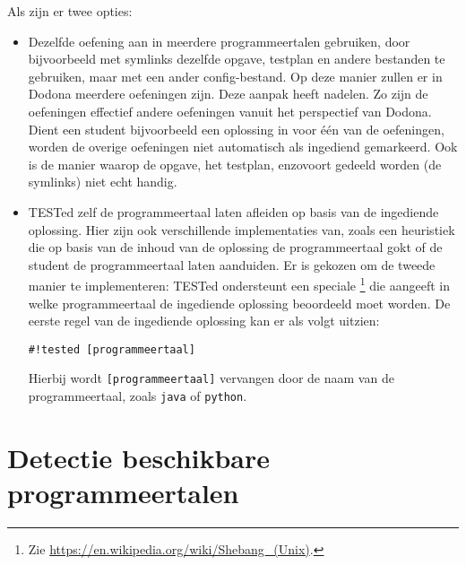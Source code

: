 Als  zijn er twee opties:
\begin{itemize}
    \item Dezelfde oefening aan in meerdere programmeertalen gebruiken, door bijvoorbeeld met symlinks dezelfde opgave, testplan en andere bestanden te gebruiken, maar met een ander config-bestand.
    Op deze manier zullen er in Dodona meerdere oefeningen zijn.
    Deze aanpak heeft nadelen.
    Zo zijn de oefeningen effectief andere oefeningen vanuit het perspectief van Dodona.
    Dient een student bijvoorbeeld een oplossing in voor één van de oefeningen, worden de overige oefeningen niet automatisch als ingediend gemarkeerd.
    Ook is de manier waarop de opgave, het testplan, enzovoort gedeeld worden (de symlinks) niet echt handig.
    \item TESTed zelf de programmeertaal laten afleiden op basis van de ingediende oplossing.
    Hier zijn ook verschillende implementaties van, zoals een heuristiek die op basis van de inhoud van de oplossing de programmeertaal gokt of de student de programmeertaal laten aanduiden.
    Er is gekozen om de tweede manier te implementeren: TESTed ondersteunt een speciale \footnote{Zie \url{https://en.wikipedia.org/wiki/Shebang_(Unix)}.} die aangeeft in welke programmeertaal de ingediende oplossing beoordeeld moet worden.
    De eerste regel van de ingediende oplossing kan er als volgt uitzien:
    \begin{verbatim}
#!tested [programmeertaal]
    \end{verbatim}
    Hierbij wordt \texttt{[programmeertaal]} vervangen door de naam van de programmeertaal, zoals \texttt{java} of \texttt{python}.
\end{itemize}

\section{Detectie beschikbare programmeertalen}\label{sec:detectie-mogelijke-programmeertalen}

